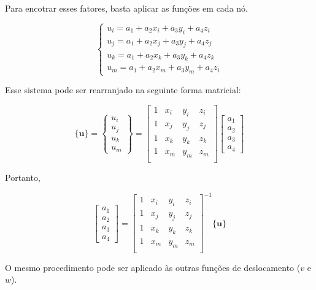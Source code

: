 Para encotrar esses fatores, basta aplicar as funções em cada nó.

\begin{equation}
    \begin{cases}
        u_i = a_1 + a_2 x_i + a_3 y_i + a_4 z_i \\
        u_j = a_1 + a_2 x_j + a_3 y_j + a_4 z_j \\
        u_k = a_1 + a_2 x_k + a_3 y_k + a_4 z_k \\
        u_m = a_1 + a_2 x_m + a_3 y_m + a_4 z_i
    \end{cases}
\end{equation}

Esse sistema pode ser rearranjado na seguinte forma matricial:

\begin{equation}
    \{\mathbf{u}\} = \begin{Bmatrix}
        u_i \\
        u_j \\
        u_k \\
        u_m
    \end{Bmatrix} = 
    \begin{bmatrix}
        1 & x_i & y_i & z_i \\
        1 & x_j & y_j & z_j \\
        1 & x_k & y_k & z_k \\
        1 & x_m & y_m & z_m \\
    \end{bmatrix}
    \begin{bmatrix}
        a_1 \\ a_2 \\ a_3 \\ a_4
    \end{bmatrix} 
\end{equation}

Portanto,

\begin{equation}
    \begin{bmatrix}
        a_1 \\ a_2 \\ a_3 \\ a_4
    \end{bmatrix}
    = \begin{bmatrix}
        1 & x_i & y_i & z_i \\
        1 & x_j & y_j & z_j \\
        1 & x_k & y_k & z_k \\
        1 & x_m & y_m & z_m \\
    \end{bmatrix}^{-1} \{\mathbf{u}\}
\end{equation}

O mesmo procedimento pode ser aplicado às outras funções de deslocamento ($v$ e $w$).




